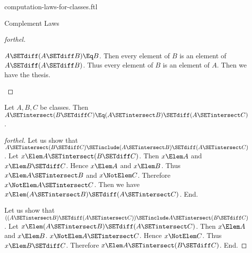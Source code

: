 \documentclass{stex}
\begin{document}
\begin{smodule}{computation-laws-for-classes.ftl}
\begin{sfragment}{Complement Laws}
\begin{proof}[forthel]
    \begin{case}{$A \SETdiff (A \SETdiff B) \Eq B$.}
      Then every element of $B$ is an element of $A \SETdiff (A \SETdiff B)$.
      Thus every element of $B$ is an element of $A$.
      Then we have the thesis.
    \end{case}
  \end{proof}

  \begin{proposition}[forthel,id=FOUNDATIONS_02_5811954316738560]
    Let $A, B, C$ be classes.
    Then $A \SETintersect (B \SETdiff C) \Eq (A \SETintersect B) \SETdiff (A \SETintersect C)$.
  \end{proposition}
  \begin{proof}[forthel]
    Let us show that $A \SETintersect (B \SETdiff C) \SETinclude (A \SETintersect B) \SETdiff (A \SETintersect C)$.
      Let $x \Elem A \SETintersect (B \SETdiff C)$.
      Then $x \Elem A$ and $x \Elem B \SETdiff C$.
      Hence $x \Elem A$ and $x \Elem B$.
      Thus $x \Elem A \SETintersect B$ and $x \NotElem C$.
      Therefore $x \NotElem A \SETintersect C$.
      Then we have $x \Elem (A \SETintersect B) \SETdiff (A \SETintersect C)$.
    End.

    Let us show that $((A \SETintersect B) \SETdiff (A \SETintersect C)) \SETinclude A \SETintersect (B \SETdiff C)$. %
      Let $x \Elem (A \SETintersect B) \SETdiff (A \SETintersect C)$.
      Then $x \Elem A$ and $x \Elem B$.
      $x \NotElem A \SETintersect C$.
      Hence $x \NotElem C$.
      Thus $x \Elem B \SETdiff C$.
      Therefore $x \Elem A \SETintersect (B \SETdiff C)$.
    End.
  \end{proof}
\end{sfragment}
\end{smodule}
\end{document}
